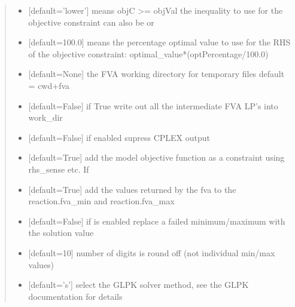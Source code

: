 \documentclass[letterpaper,12pt,english]{sphinxmanual}
\begin{document}
\begin{fulllineitems}
\begin{quote}
\begin{description}
\begin{itemize}
\item {} 
\sphinxAtStartPar
{} \textendash{} {[}default=’lower’{]} means objC \textgreater{}= objVal the inequality to use for the objective constraint can also be  or 

\item {} 
\sphinxAtStartPar
{} \textendash{} {[}default=100.0{]} means the percentage optimal value to use for the RHS of the objective constraint: optimal\_value*(optPercentage/100.0)

\item {} 
\sphinxAtStartPar
{} \textendash{} {[}default=None{]} the FVA working directory for temporary files default = cwd+fva

\item {} 
\sphinxAtStartPar
{} \textendash{} {[}default=False{]} if True write out all the intermediate FVA LP’s into work\_dir

\item {} 
\sphinxAtStartPar
{} \textendash{} {[}default=False{]} if enabled supress CPLEX output

\item {} 
\sphinxAtStartPar
{} \textendash{} {[}default=True{]} add the model objective function as a constraint using rhs\_sense etc. If

\item {} 
\sphinxAtStartPar
{} \textendash{} {[}default=True{]} add the values returned by the fva to the reaction.fva\_min and reaction.fva\_max

\item {} 
\sphinxAtStartPar
{} \textendash{} {[}default=False{]} if  is enabled replace a failed minimum/maximum with the solution value

\item {} 
\sphinxAtStartPar
{} \textendash{} {[}default=10{]} number of digits is round off (not individual min/max values)

\item {} 
\sphinxAtStartPar
{} \textendash{} {[}default=’s’{]} select the GLPK solver method, see the GLPK documentation for details


\end{itemize}
\end{description}
\end{quote}
\end{fulllineitems}
\end{document}
